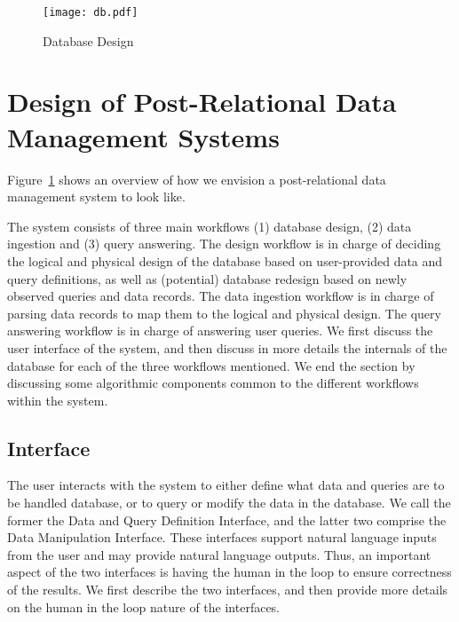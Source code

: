 \begin{figure}
    \centering
    \texttt{[image: db.pdf]}
    \caption{Database Design}
    \label{fig:design}
\end{figure}

\section{Design of Post-Relational Data Management Systems}
Figure~\ref{fig:design} shows an overview of how we envision a post-relational data management system to look like. 

The system consists of three main workflows (1) database design, (2)  data ingestion and (3) query answering. The design workflow is in charge of deciding the logical and physical design of the database based on user-provided data and query definitions, as well as (potential) database redesign based on newly observed queries and data records. The data ingestion workflow is in charge of parsing data records to map them to the logical and physical design. The query answering workflow is in charge of answering user queries. We first discuss the user interface of the system, and then discuss in more details the internals of the database for each of the three workflows mentioned. We end the section by discussing some algorithmic components common to the different workflows within the system.



\subsection{Interface}
The user interacts with the system to either define what data and queries are to be handled database, or to query or modify the data in the database. We call the former the Data and Query Definition Interface, and the latter two comprise the Data Manipulation Interface. These interfaces support natural language inputs from the user and may provide natural language outputs. Thus, an important aspect of the two interfaces is having the human in the loop to ensure correctness of the results. We first describe the two interfaces, and then provide more details on the human in the loop nature of the interfaces. 

